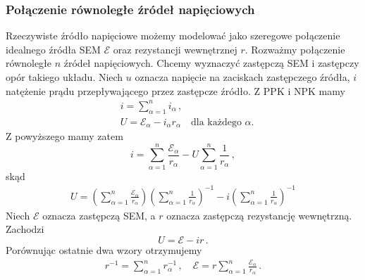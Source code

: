 \documentclass[../main.tex]{subfiles}
\begin{document}
\subsubsection*{Połączenie równoległe źródeł napięciowych}
Rzeczywiste źródło napięciowe możemy modelować jako szeregowe połączenie idealnego źródła SEM \(\mathcal{E}\) oraz rezystancji wewnętrznej \(r\). Rozważmy połączenie równoległe \(n\) źródeł napięciowych. Chcemy wyznaczyć zastępczą SEM i zastępczy opór takiego układu. Niech \(u\) oznacza napięcie na zaciskach zastępczego źródła, \(i\) natężenie prądu przepływającego przez zastępcze źródło. Z PPK i NPK mamy
\begin{equation*}
    \begin{split}
        & i=\sum_{\alpha=1}^ni_\alpha\,,\\
        &U=\mathcal{E}_\alpha-i_\alpha r_\alpha\quad\text{dla każdego \(\alpha\).}
    \end{split}
\end{equation*}
Z powyższego mamy zatem
\begin{equation*}
    i=\sum_{\alpha=1}^n\frac{\mathcal{E}_\alpha}{r_\alpha}-U\sum_{\alpha=1}^n\frac{1}{r_\alpha}\,,
\end{equation*}
skąd
\begin{equation*}
\begin{split}
    U=\left(\sum_{\alpha=1}^n\frac{\mathcal{E}_\alpha}{r_\alpha}\right)\left(\sum_{\alpha=1}^n\frac{1}{r_\alpha}\right)^{-1}-i\left(\sum_{\alpha=1}^n\frac{1}{r_\alpha}\right)^{-1}
\end{split}
\end{equation*}
Niech \(\mathcal{E}\) oznacza zastępczą SEM, a \(r\) oznacza zastępczą rezystancję wewnętrzną. Zachodzi
\begin{equation*}
    U=\mathcal{E}-ir\,.
\end{equation*}
Porównując ostatnie dwa wzory otrzymujemy
\begin{equation*}
    \begin{split}
        r^{-1}=\sum_{\alpha=1}^nr_\alpha^{-1}\,,\quad\mathcal{E}=r\sum_{\alpha=1}^n\frac{\mathcal{E}_\alpha}{r_\alpha}\,.
    \end{split}
\end{equation*}
\end{document}
